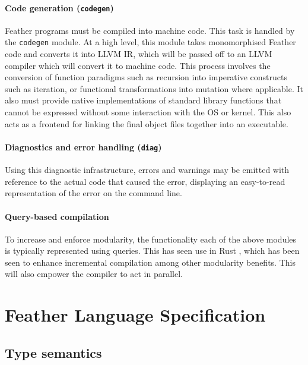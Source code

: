 \documentclass[UKenglish, 11pt, a4paper, parskip=half]{scrbook}
\newcommand{\inlinecode}[1]{\lstinline{#1}}
\begin{document}
\subsection{Code generation (\inlinecode{codegen})}

Feather programs must be compiled into machine code.
This task is handled by the \inlinecode{codegen} module.
At a high level, this module takes monomorphised Feather code and converts it into LLVM IR, which will be passed off to an LLVM compiler which will convert it to machine code.
This process involves the conversion of function paradigms such as recursion into imperative constructs such as iteration, or functional transformations into mutation where applicable.
It also must provide native implementations of standard library functions that cannot be expressed without some interaction with the OS or kernel.
This also acts as a frontend for linking the final object files together into an executable.

\subsection{Diagnostics and error handling (\inlinecode{diag})}

Using this diagnostic infrastructure, errors and warnings may be emitted with reference to the actual code that caused the error, displaying an easy-to-read representation of the error on the command line.

\subsection{Query-based compilation}

To increase and enforce modularity, the functionality each of the above modules is typically represented using queries.
This has seen use in Rust \cite{RustDevGuideOverview}, which has been seen to enhance incremental compilation among other modularity benefits.
This will also empower the compiler to act in parallel.

\mainmatter

\part{Feather Language Specification}

\chapter{Type semantics}
\end{document}
